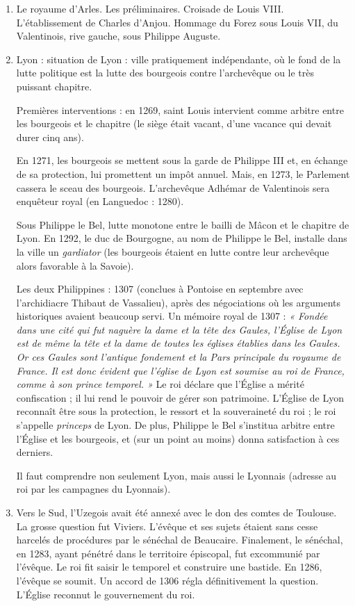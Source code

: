 \documentclass[french,twoside]{book} %
\begin{document}
\begin{enumerate}[itemsep=\baselineskip,]
\item Le royaume d’Arles. Les préliminaires. Croisade de Louis VIII. L’établissement de Charles d’Anjou. Hommage du Forez sous Louis VII, du Valentinois, rive gauche, sous Philippe Auguste.
\item Lyon : situation de Lyon : ville pratiquement indépendante, où le fond de la lutte politique est la lutte des bourgeois contre l’archevêque ou le très puissant chapitre.\par
Premières interventions : en 1269, saint Louis intervient comme arbitre entre les bourgeois et le chapitre (le siège était vacant, d’une vacance qui devait durer cinq ans).\par
En 1271, les bourgeois se mettent sous la garde de Philippe III et, en échange de sa protection, lui promettent un impôt annuel. Mais, en 1273, le Parlement cassera le sceau des bourgeois. L’archevêque Adhémar de Valentinois sera enquêteur royal (en Languedoc : 1280).\par
Sous Philippe le Bel, lutte monotone entre le bailli de Mâcon et le chapitre de Lyon. En 1292, le duc de Bourgogne, au nom de Philippe le Bel, installe dans la ville un {\itshape gardiator} (les bourgeois étaient en lutte contre leur archevêque alors favorable à la Savoie).\par
Les deux Philippines : 1307 (conclues à Pontoise en septembre avec l’archidiacre Thibaut de Vassalieu), après des négociations où les arguments historiques avaient beaucoup servi. Un mémoire royal de 1307 : \emph{« Fondée dans une cité qui fut naguère la dame et la tête des Gaules, l’Église de Lyon est de même la tête et la dame de toutes les églises établies dans les Gaules. Or ces Gaules sont l’antique fondement et la {\itshape Pars} principale du royaume de France. Il est donc évident que l’église de Lyon est soumise au roi de France, comme à son prince temporel. »} Le roi déclare que l’Église a mérité confiscation ; il lui rend le pouvoir de gérer son patrimoine. L’Église de Lyon reconnaît être sous la protection, le ressort et la souveraineté du roi ; le roi s’appelle \emph{princeps} de Lyon. De plus,  
\label{p35} Philippe le Bel s’institua arbitre entre l’Église et les bourgeois, et (sur un point au moins) donna satisfaction à ces derniers.\par
Il faut comprendre non seulement Lyon, mais aussi le Lyonnais (adresse au roi par les campagnes du Lyonnais).

\item Vers le Sud, l’Uzegois avait été annexé avec le don des comtes de Toulouse. La grosse question fut Viviers. L’évêque et ses sujets étaient sans cesse harcelés de procédures par le sénéchal de Beaucaire. Finalement, le sénéchal, en 1283, ayant pénétré dans le territoire épiscopal, fut excommunié par l’évêque. Le roi fit saisir le temporel et construire une bastide. En 1286, l’évêque se soumit. Un accord de 1306 régla définitivement la question. L’Église reconnut le gouvernement du roi.\par


\end{enumerate}
\end{document}
